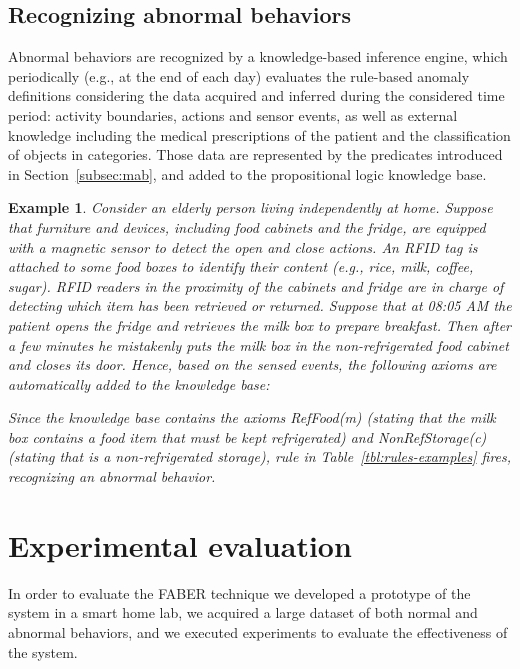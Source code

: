 \documentclass[10pt, conference, compsocconf]{IEEEtran}
\newtheorem{example}{Example}
\begin{document}
\subsection{Recognizing abnormal behaviors}
Abnormal behaviors are recognized by a knowledge-based inference engine,
which periodically (e.g., at the end of each day) evaluates the rule-based 
anomaly definitions considering 
the data acquired and inferred during the considered time period:
activity boundaries, actions and sensor events, as well as external 
knowledge including the medical prescriptions of the patient and the classification
of objects in categories. 
Those data are represented by the predicates introduced in 
Section~\ref{subsec:mab}, and added to the propositional 
logic knowledge base. 


\begin{example}
Consider an elderly person living independently at home. 
Suppose that furniture and devices, including food cabinets and the fridge, 
are equipped with a magnetic sensor to detect the \emph{open}
and \emph{close} actions.
An RFID tag is attached to some food boxes to identify their content (e.g., 
rice, milk, coffee, sugar). RFID readers in the proximity of the cabinets
and fridge are in charge of 
detecting which item has been retrieved or returned. 
Suppose that at 08:05 AM the patient opens the fridge  and retrieves the milk
box  to prepare breakfast. Then after a few minutes he mistakenly puts the milk box 
in the non-refrigerated food cabinet  and closes its door. 
Hence, based on the sensed events, the following axioms are 
automatically added to the knowledge base:

Since the knowledge base contains the axioms \emph{RefFood(m)} (stating that
the milk box contains a food item that must be kept refrigerated) 
and \emph{NonRefStorage(c)} (stating that  is a non-refrigerated storage), 
rule  in Table~\ref{tbl:rules-examples} fires,
recognizing an abnormal behavior.
\end{example}
 
 


\section{Experimental evaluation}
\label{sec:experiments}
In order to evaluate the FABER technique we developed a prototype
of the system in a smart home lab, we acquired a large dataset of both normal and abnormal
behaviors, and we executed experiments to evaluate the effectiveness of the system.
\end{document}
